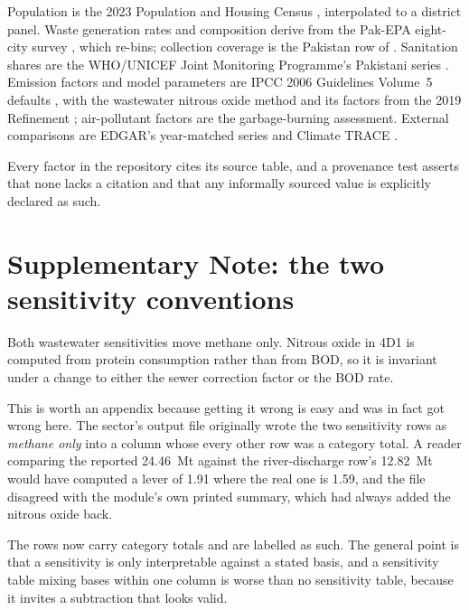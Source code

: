 Population is the 2023 Population and Housing Census \citep{pbscensus2023}, interpolated to a
district panel. Waste generation rates and composition derive from the Pak-EPA eight-city
survey \citep{pakepa1996}, which \citet{kaza2018} re-bins; collection coverage is the Pakistan
row of \citet{kaza2018}. Sanitation shares are the WHO/UNICEF Joint Monitoring Programme's
Pakistani series \citep{jmp2023}. Emission factors and model parameters are IPCC 2006
Guidelines Volume~5 defaults \citep{ipcc2006waste}, with the wastewater nitrous oxide method
and its factors from the 2019 Refinement \citep{ipcc2019}; air-pollutant factors are the
\citet{andreae2019} garbage-burning assessment. External comparisons are EDGAR's year-matched
series \citep{edgar2025booklet} and Climate TRACE \citep{climatetrace}.

Every factor in the repository cites its source table, and a provenance test asserts that none
lacks a citation and that any informally sourced value is explicitly declared as such.

\section{Supplementary Note: the two sensitivity conventions}
\label{app:sens}

Both wastewater sensitivities move methane only. Nitrous oxide in 4D1 is computed from protein
consumption rather than from BOD, so it is invariant under a change to either the sewer
correction factor or the BOD rate.

This is worth an appendix because getting it wrong is easy and was in fact got wrong here. The
sector's output file originally wrote the two sensitivity rows as \emph{methane only} into a
column whose every other row was a category total. A reader comparing the reported
\SI{24.46}{\mega\tonne} against the river-discharge row's \SI{12.82}{\mega\tonne} would have
computed a lever of \num{1.91} where the real one is \num{1.59}, and the file disagreed with
the module's own printed summary, which had always added the nitrous oxide back.

The rows now carry category totals and are labelled as such. The general point is that a
sensitivity is only interpretable against a stated basis, and a sensitivity table mixing bases
within one column is worse than no sensitivity table, because it invites a subtraction that
looks valid.
